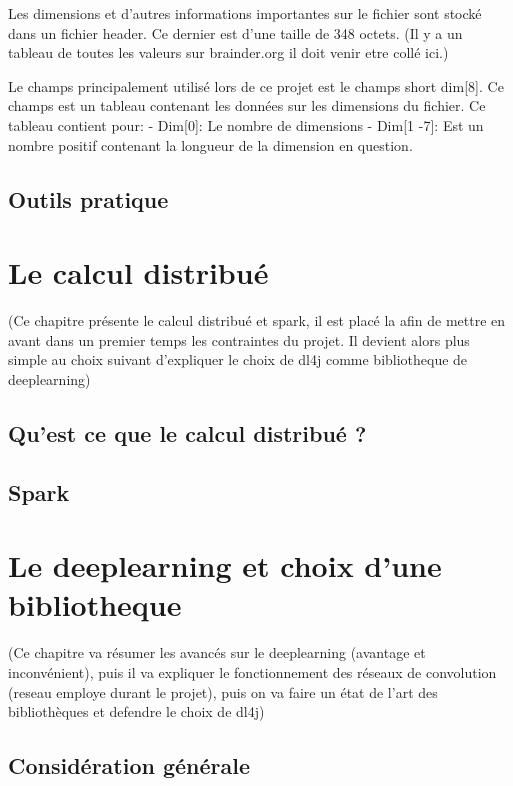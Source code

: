 \documentclass[a4paper,10pt,openany,oneside]{sphinxmanual}
\begin{document}
Les dimensions et d'autres informations importantes sur le fichier sont stocké dans un fichier
header. Ce dernier est d'une taille de 348 octets. (Il y a un tableau de toutes les valeurs sur
brainder.org il doit venir etre collé ici.)

Le champs principalement utilisé lors de ce projet est le champs short dim{[}8{]}. Ce champs est un
tableau contenant les données sur les dimensions du fichier. Ce tableau contient pour:
- Dim{[}0{]}: Le nombre de dimensions
- Dim{[}1 -7{]}: Est un nombre positif contenant la longueur de la dimension en question.


\subsection{Outils pratique}
\label{index:outils-pratique}

\section{Le calcul distribué}
\label{index:le-calcul-distribue}
(Ce chapitre présente le calcul distribué et spark, il est placé la afin de mettre en avant dans un
premier temps les contraintes du projet. Il devient alors plus simple au choix suivant d'expliquer le
choix de dl4j comme bibliotheque de deeplearning)


\subsection{Qu'est ce que le calcul distribué ?}
\label{index:qu-est-ce-que-le-calcul-distribue}

\subsection{Spark}
\label{index:spark}

\section{Le deeplearning et choix d'une bibliotheque}
\label{index:le-deeplearning-et-choix-d-une-bibliotheque}
(Ce chapitre va résumer les avancés sur le deeplearning (avantage et inconvénient), puis il va expliquer le fonctionnement des réseaux de convolution (reseau employe durant le projet), puis on va faire un état
de l'art des bibliothèques et defendre le choix de dl4j)


\subsection{Considération générale}
\label{index:consideration-generale}
\end{document}
